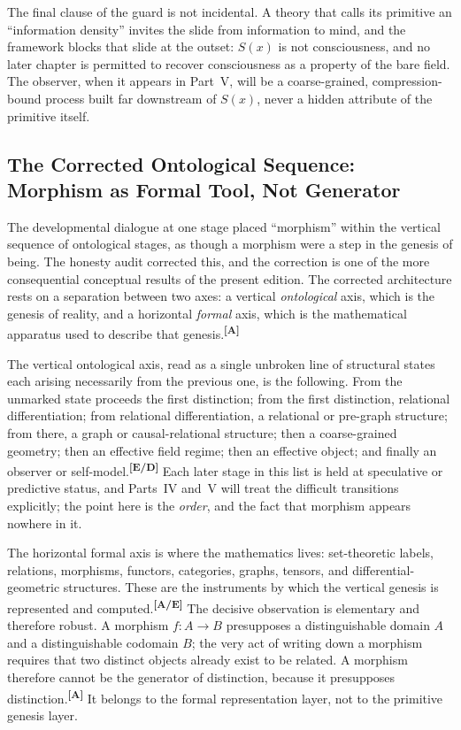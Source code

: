 \documentclass[12pt,a4paper,twoside]{article}
\theoremstyle{plain}
\theoremstyle{definition}
\theoremstyle{remark}
\newcommand{\catmark}[1]{\textsuperscript{\textsf{\textbf{[#1]}}}}
\begin{document}
\noindent The final clause of the guard is not incidental. A theory that calls its primitive an ``information density'' invites the slide from information to mind, and the framework blocks that slide at the outset: $S(x)$ is not consciousness, and no later chapter is permitted to recover consciousness as a property of the bare field. The observer, when it appears in Part~V, will be a coarse-grained, compression-bound process built far downstream of $S(x)$, never a hidden attribute of the primitive itself.

\subsection{The Corrected Ontological Sequence: Morphism as Formal Tool, Not Generator}
\label{subsec:corrected-sequence}

The developmental dialogue at one stage placed ``morphism'' within the vertical sequence of ontological stages, as though a morphism were a step in the genesis of being. The honesty audit corrected this, and the correction is one of the more consequential conceptual results of the present edition. The corrected architecture rests on a separation between two axes: a vertical \emph{ontological} axis, which is the genesis of reality, and a horizontal \emph{formal} axis, which is the mathematical apparatus used to describe that genesis.\catmark{A}

The vertical ontological axis, read as a single unbroken line of structural states each arising necessarily from the previous one, is the following. From the unmarked state proceeds the first distinction; from the first distinction, relational differentiation; from relational differentiation, a relational or pre-graph structure; from there, a graph or causal-relational structure; then a coarse-grained geometry; then an effective field regime; then an effective object; and finally an observer or self-model.\catmark{E/D} Each later stage in this list is held at speculative or predictive status, and Parts~IV and~V will treat the difficult transitions explicitly; the point here is the \emph{order}, and the fact that morphism appears nowhere in it.

The horizontal formal axis is where the mathematics lives: set-theoretic labels, relations, morphisms, functors, categories, graphs, tensors, and differential-geometric structures. These are the instruments by which the vertical genesis is represented and computed.\catmark{A/E} The decisive observation is elementary and therefore robust. A morphism $f\colon A\to B$ presupposes a distinguishable domain $A$ and a distinguishable codomain $B$; the very act of writing down a morphism requires that two distinct objects already exist to be related. A morphism therefore cannot be the generator of distinction, because it presupposes distinction.\catmark{A} It belongs to the formal representation layer, not to the primitive genesis layer.
\end{document}
